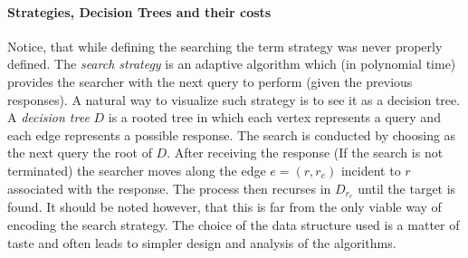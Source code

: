 % 



% 

\paragraph{Strategies, Decision Trees and their costs}
Notice, that while defining the searching the term strategy was never properly defined. The \textit{search strategy} is an adaptive algorithm which (in polynomial time) provides the searcher with the next query to perform (given the previous responses). A natural way to visualize such strategy is to see it as a decision tree. A \textit{decision tree} $D$ is a rooted tree in which each vertex represents a query and each edge represents a possible response. The search is conducted by choosing as the next query the root of $D$. After receiving the response (If the search is not terminated) the searcher moves along the edge $e=(r, r_e)$ incident to $r$ associated with the response. The process then recurses in $D_{r_e}$ until the target is found. It should be noted however, that this is far from the only viable way of encoding the search strategy. The choice of the data structure used is a matter of taste and often leads to simpler design and analysis of the algorithms.

